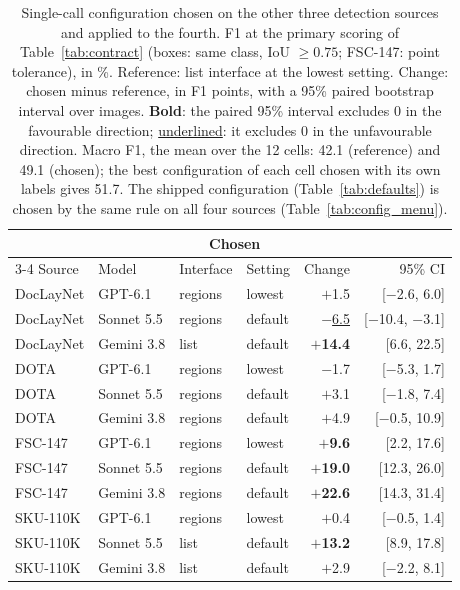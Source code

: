 \begin{table}[tp]
\centering\footnotesize\setlength{\tabcolsep}{5pt}
\caption{Single-call configuration chosen on the other three detection sources and applied to the fourth. F1 at the primary scoring of Table~\ref{tab:contract} (boxes: same class, IoU $\ge0.75$; FSC-147: point tolerance), in \%. Reference: list interface at the lowest setting. Change: chosen minus reference, in F1 points, with a 95\% paired bootstrap interval over images. \textbf{Bold}: the paired 95\% interval excludes 0 in the favourable direction; \underline{underlined}: it excludes 0 in the unfavourable direction. Macro F1, the mean over the 12 cells: 42.1 (reference) and 49.1 (chosen); the best configuration of each cell chosen with its own labels gives 51.7. The shipped configuration (Table~\ref{tab:defaults}) is chosen by the same rule on all four sources (Table~\ref{tab:config_menu}).}\label{tab:config}
\begin{tabular}{@{}llllrr@{}}\toprule
& & \multicolumn{2}{c}{Chosen} & & \\\cmidrule(lr){3-4}
Source & Model & Interface & Setting & Change & 95\% CI \\\midrule
DocLayNet & GPT-6.1 & regions & lowest & $+$1.5 & [$-$2.6, 6.0] \\
DocLayNet & Sonnet 5.5 & regions & default & \underline{$-$6.5} & [$-$10.4, $-$3.1] \\
DocLayNet & Gemini 3.8 & list & default & {\bfseries\boldmath $+$14.4} & [6.6, 22.5] \\
DOTA & GPT-6.1 & regions & lowest & $-$1.7 & [$-$5.3, 1.7] \\
DOTA & Sonnet 5.5 & regions & default & $+$3.1 & [$-$1.8, 7.4] \\
DOTA & Gemini 3.8 & regions & default & $+$4.9 & [$-$0.5, 10.9] \\
FSC-147 & GPT-6.1 & regions & lowest & {\bfseries\boldmath $+$9.6} & [2.2, 17.6] \\
FSC-147 & Sonnet 5.5 & regions & default & {\bfseries\boldmath $+$19.0} & [12.3, 26.0] \\
FSC-147 & Gemini 3.8 & regions & default & {\bfseries\boldmath $+$22.6} & [14.3, 31.4] \\
SKU-110K & GPT-6.1 & regions & lowest & $+$0.4 & [$-$0.5, 1.4] \\
SKU-110K & Sonnet 5.5 & list & default & {\bfseries\boldmath $+$13.2} & [8.9, 17.8] \\
SKU-110K & Gemini 3.8 & list & default & $+$2.9 & [$-$2.2, 8.1] \\
\bottomrule\end{tabular}
\end{table}
